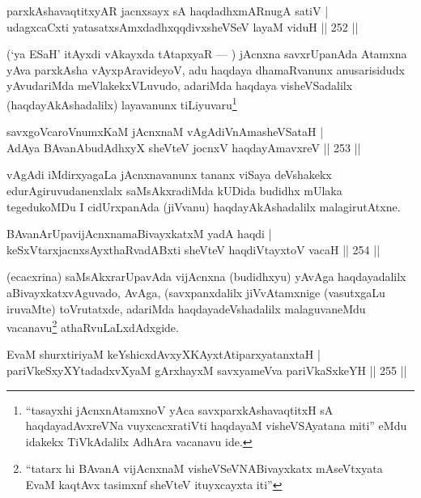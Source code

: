 \begin{shl}
parxkAshavaqtitxyAR jacnxsayx sA haqdadhxmARnugA satiV |\\
udagxcaCxti yatasatxsAmxdadhxqqdivxsheVSeV layaM viduH \hfill || 252 ||
\end{shl}

\begin{artha}
(`ya ESaH' itAyxdi vAkayxda tAtapxyaR  {\rm ---} ) jAcnxna savxrUpanAda Atamxna yAva parxkAsha vAyxpAravideyoV, adu haqdaya dhamaRvanunx anusarisidudx yAvudariMda meVlakekxVLuvudo, adariMda haqdaya visheVSadalilx (haqdayAkAshadalilx) layavanunx tiLiyuvaru\footnote{``tasayxhi jAcnxnAtamxnoV yAca savxparxkAshavaqtitxH sA haqdayadAvxreVNa vuyxcacxratiVti haqdayaM visheVSAyatana miti'' eMdu idakekx TiVkAdalilx AdhAra vacanavu ide.}
\end{artha}

\begin{shl}
savxgoVcaroVnumxKaM jAcnxnaM vAgAdiVnAmasheVSataH |\\
AdAya BAvanAbudAdhxyX sheVteV jocnxV haqdayAmavxreV \hfill || 253 ||
\end{shl}

\begin{artha}
vAgAdi iMdirxyagaLa jAcnxnavanunx tananx viSaya deVshakekx edurAgiruvudanenxlalx saMsAkxradiMda kUDida budidhx mUlaka tegedukoMDu I cidUrxpanAda (jiVvanu) haqdayAkAshadalilx malagirutAtxne.
\end{artha}

\begin{shl}
BAvanArUpavijAcnxnamaBivayxkatxM yadA haqdi |\\
keSxVtarxjacnxsAyxthaRvadABxti sheVteV haqdiVtayxtoV vacaH \hfill || 254 ||
\end{shl}

\begin{artha}
(ecacxrina) saMsAkxrarUpavAda vijAcnxna (budidhxyu) yAvAga haqdayadalilx aBivayxkatxvAguvado, AvAga, (savxpanxdalilx jiVvAtamxnige (vasutxgaLu iruvaMte) toVru\-tatxde, adariMda haqdayadeVshadalilx malaguvaneMdu vacanavu\footnote{``tatarx hi BAvanA vijAcnxnaM visheVSeVNABivayxkatx mAseVtxyata EvaM kaqtAvx tasimxnf sheVteV ituyxcayxta  iti''} athaRvuLaLxdAdxgide.
\end{artha}


\begin{shl}
EvaM shurxtiriyaM keYshicxdAvxyXKAyxtA\s tiparxyatanxtaH |\\
pariVkeSxyXYtadadxvXyaM gArxhayxM savxyameVva pariVkaSxkeYH \hfill || 255 ||
\end{shl}

